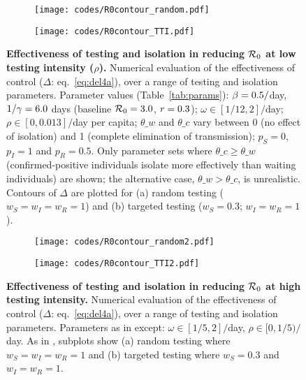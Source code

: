 \newpage
\begin{figure}[h!]
\centering
\begin{subfigure}[t]{.49\textwidth}
\centering
\texttt{[image: codes/R0contour\_random.pdf]}
\caption{}\label{p.a}
\end{subfigure}
%
\begin{subfigure}[t]{.49\textwidth}
\centering
\texttt{[image: codes/R0contour\_TTI.pdf]}
\caption{}\label{p.b}
\end{subfigure}
\caption{
{\bf Effectiveness of testing and isolation in reducing $\mathcal{R}_0$ at low \percap testing intensity ($\rho$).}
Numerical evaluation of the effectiveness of control ($\Delta$: eq.~\ref{eq:del4a}), over a range of testing and isolation parameters. Parameter values (Table~\ref{tab:params}):
$\beta=0.5/$day, $1/\gamma= 6.0$ days (baseline $\mathcal{R}_0=3.0$, $r=0.3$); $\omega \in [1/12,2]/$day;  $\rho \in [0,0.013]/$day per capita; $\theta\_w$ and $\theta\_c$ vary between 0 (no effect of isolation) and 1 (complete elimination of transmission); $p_S=0$, $p_I=1$ and $p_R=0.5$. Only parameter sets where $\theta\_c \geq \theta\_w$ (confirmed-positive individuals isolate more effectively than waiting individuals) are shown; the alternative case, $\theta\_w > \theta\_c$, is unrealistic. Contours of $\Delta$ are plotted for (a) random testing ($w_S=w_I=w_R=1$) and (b) targeted testing ($w_S=0.3$; $w_I=w_R=1$). 
}
\label{pan}
\end{figure}

\begin{figure}[h!]
\centering
\begin{subfigure}[t]{.49\textwidth}
\centering
\texttt{[image: codes/R0contour\_random2.pdf]}
\caption{}
\end{subfigure}
%
\begin{subfigure}[t]{.49\textwidth}
\centering
\texttt{[image: codes/R0contour\_TTI2.pdf]}
\caption{}
\end{subfigure}
\caption{
  {\bf Effectiveness of testing and isolation in reducing $\mathcal{R}_0$ at high \percap testing intensity.}
  Numerical evaluation of the effectiveness of control ($\Delta$: eq.~\ref{eq:del4a}), over a range of testing and isolation parameters. Parameters as in  except: $\omega \in [1/5,2]/$day, $\rho \in [0,1/5)/$day. As in , subplots show (a) random testing where $w_S=w_I=w_R=1$ and (b) targeted testing where $w_S=0.3$ and $w_I=w_R=1$.
}
\label{pan2}
\end{figure}

